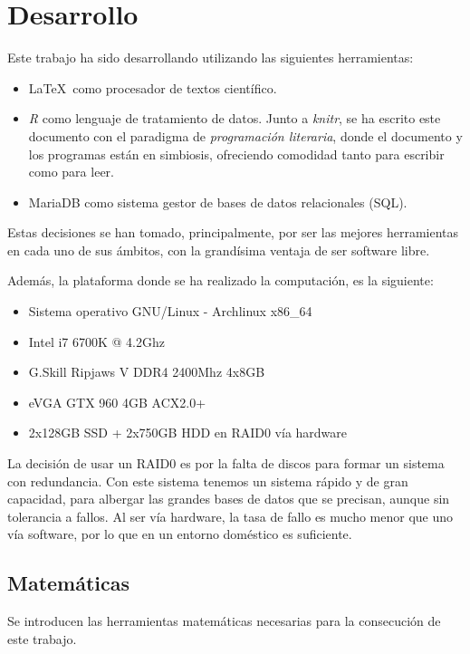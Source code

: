 \documentclass[a4paper,11pt]{book}\usepackage[]{graphicx}\usepackage[]{color}
\begin{document}
\chapter{Desarrollo}



Este trabajo ha sido desarrollando utilizando las siguientes herramientas:

\begin{itemize}
  \item \LaTeX \, como procesador de textos científico.
  \item \emph{R} como lenguaje de tratamiento de datos. Junto a \emph{knitr},
  se ha escrito este documento con el paradigma de \emph{programación literaria},
  donde el documento y los programas están en simbiosis, ofreciendo comodidad
  tanto para escribir como para leer.
  \item MariaDB como sistema gestor de bases de datos relacionales (SQL).
\end{itemize}

Estas decisiones se han tomado, principalmente, por ser las mejores herramientas
en cada uno de sus ámbitos, con la grandísima ventaja de ser software libre.

Además, la plataforma donde se ha realizado la computación, es la siguiente:
\begin{itemize}
  \item Sistema operativo GNU/Linux - Archlinux x86\_64
  \item Intel i7 6700K @ 4.2Ghz
  \item G.Skill Ripjaws V DDR4 2400Mhz 4x8GB
  \item eVGA GTX 960 4GB ACX2.0+
  \item 2x128GB SSD + 2x750GB HDD en RAID0 vía hardware
\end{itemize}

La decisión de usar un RAID0 es por la falta de discos para formar un sistema
con redundancia. Con este sistema tenemos un sistema rápido y de gran capacidad,
para albergar las grandes bases de datos que se precisan, aunque sin tolerancia
a fallos. Al ser vía hardware, la tasa de fallo es mucho menor que uno vía
software, por lo que en un entorno doméstico es suficiente.


\section{Matemáticas}

Se introducen las herramientas matemáticas necesarias para la consecución de este trabajo.
\end{document}
